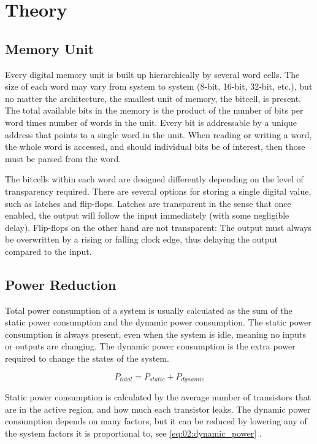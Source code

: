 \section{Theory}    \label{sec:02:theory}

\subsection{Memory Unit}
Every digital memory unit is built up hierarchically by several word cells. The size of each word may vary from system to system (8-bit, 16-bit, 32-bit, etc.), but no matter the architecture, the smallest unit of memory, the bitcell, is present. The total available bits in the memory is the product of the number of bits per word times number of words in the unit. Every bit is addressable by a unique address that points to a single word in the unit. When reading or writing a word, the whole word is accessed, and should individual bits be of interest, then those must be parsed from the word.

The bitcells within each word are designed differently depending on the level of transparency required. There are several options for storing a single digital value, such as latches and flip-flops. Latches are transparent in the sense that once enabled, the output will follow the input immediately (with some negligible delay). Flip-flops on the other hand are not transparent: The output must always be overwritten by a rising or falling clock edge, thus delaying the output compared to the input.

\subsection{Power Reduction}
Total power consumption of a system is usually calculated as the sum of the static power consumption and the dynamic power consumption. The static power consumption is always present, even when the system is idle, meaning no inputs or outputs are changing. The dynamic power consumption is the extra power required to change the states of the system.

\begin{equation}
    P_{total} = P_{static} + P_{dynamic}
    \label{eq:02:total_power}
\end{equation}

Static power consumption is calculated by the average number of transistors that are in the active region, and how much each transistor leaks. The dynamic power consumption depends on many factors, but it can be reduced by lowering any of the system factors it is proportional to, see \autoref{eq:02:dynamic_power} \cite{forelesningslidesPower}.

